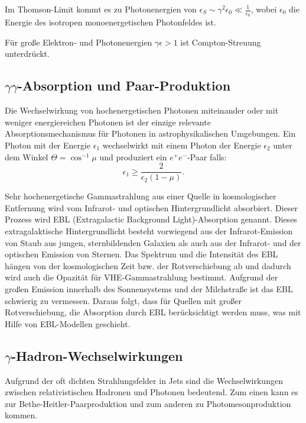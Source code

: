 Im Thomson-Limit kommt es zu Photonenergien von $\epsilon_S \sim \gamma^2 \epsilon_0 \ll \frac{1}{\epsilon_0} $, wobei $\epsilon_0$ die Energie des isotropen monoenergetischen Photonfeldes ist.\cite{RelativisticJets}

Für große Elektron- und Photonenergien $\gamma \epsilon > 1$ ist Compton-Streuung unterdrückt.\cite{RelativisticJets}


\subsection{$\gamma\gamma$-Absorption und Paar-Produktion}
Die Wechselwirkung von hochenergetischen Photonen miteinander oder mit weniger energiereichen Photonen ist der einzige relevante Absorptionsmechanismus für Photonen in astrophysikalischen Umgebungen.
Ein Photon mit der Energie $\epsilon_1$ wechselwirkt mit einem Photon der Energie $\epsilon_2$ unter dem Winkel $\Theta=\cos^{-1}\mu$ und produziert ein $e^+e^-$-Paar falls:
\begin{equation}
 \epsilon_1 \geq \frac{2}{\epsilon_2 (1-\mu)}.
\end{equation}

Sehr hochenergetische Gammastrahlung aus einer Quelle in kosmologischer Entfernung wird vom Infrarot- und optischen Hintergrundlicht absorbiert. 
Dieser Prozess wird EBL (Extragalactic Background Light)-Absorption genannt. 
Dieses extragalaktische Hintergrundlicht besteht vorwiegend aus der Infrarot-Emission von Staub aus jungen, sternbildenden Galaxien als auch aus der Infrarot- und der optischen Emission von Sternen.
Das Spektrum und die Intensität des EBL hängen von der kosmologischen Zeit bzw. der Rotverschiebung ab und dadurch wird auch die Opazität für VHE-Gammastrahlung bestimmt.
Aufgrund der großen Emission innerhalb des Sonnensystems und der Milchstraße ist das EBL schwierig zu vermessen.
Daraus folgt, dass für Quellen mit großer Rotverschiebung, die Absorption durch EBL berücksichtigt werden muss, was mit Hilfe von EBL-Modellen geschieht.\cite{RelativisticJets}


\subsection{$\gamma$-Hadron-Wechselwirkungen}
Aufgrund der oft dichten Strahlungsfelder in Jets sind die Wechselwirkungen zwischen relativistischen Hadronen und Photonen bedeutend.
Zum einen kann es zur Bethe-Heitler-Paarproduktion und zum anderen zu Photomesonproduktion kommen.\cite{RelativisticJets}

